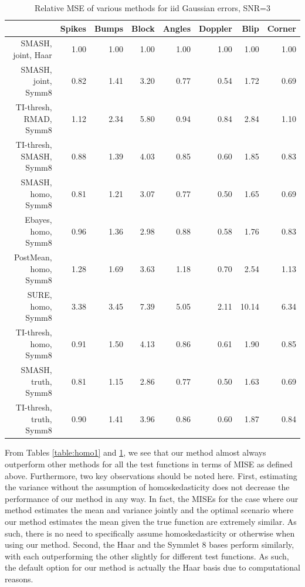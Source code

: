 \documentclass[12pt]{article}
\begin{document}
\begin{table}[ht]
\centering
\begin{tabular}{rrrrrrrr}
  \hline
 & Spikes & Bumps & Block & Angles & Doppler & Blip & Corner \\
  \hline
SMASH, joint, Haar & 1.00 & 1.00 & 1.00 & 1.00 & 1.00 & 1.00 & 1.00 \\
  SMASH, joint, Symm8 & 0.82 & 1.41 & 3.20 & 0.77 & 0.54 & 1.72 & 0.69 \\
  TI-thresh, RMAD, Symm8 & 1.12 & 2.34 & 5.80 & 0.94 & 0.84 & 2.84 & 1.10 \\
  TI-thresh, SMASH, Symm8 & 0.88 & 1.39 & 4.03 & 0.85 & 0.60 & 1.85 & 0.83 \\
  SMASH, homo, Symm8 & 0.81 & 1.21 & 3.07 & 0.77 & 0.50 & 1.65 & 0.69 \\
  Ebayes, homo, Symm8 & 0.96 & 1.36 & 2.98 & 0.88 & 0.58 & 1.76 & 0.83 \\
  PostMean, homo, Symm8 & 1.28 & 1.69 & 3.63 & 1.18 & 0.70 & 2.54 & 1.13 \\
  SURE, homo, Symm8 & 3.38 & 3.45 & 7.39 & 5.05 & 2.11 & 10.14 & 6.34 \\
  TI-thresh, homo, Symm8 & 0.91 & 1.50 & 4.13 & 0.86 & 0.61 & 1.90 & 0.85 \\
  SMASH, truth, Symm8 & 0.81 & 1.15 & 2.86 & 0.77 & 0.50 & 1.63 & 0.69 \\
  TI-thresh, truth, Symm8 & 0.90 & 1.41 & 3.96 & 0.86 & 0.60 & 1.87 & 0.84 \\
   \hline
\end{tabular}
\caption{Relative MSE of various methods for iid Gaussian errors, SNR=3} 
\label{table:homo3}
\end{table}
From Tables \ref{table:homo1} and \ref{table:homo3}, we see that our method almost always outperform other methods for all the test functions in terms of MISE as defined above. Furthermore, two key observations should be noted here. First, estimating the variance without the assumption of homoskedasticity does not decrease the performance of our method in any way. In fact, the MISEs for the case where our method estimates the mean and variance jointly and the optimal scenario where our method estimates the mean given the true function are extremely similar. As such, there is no need to specifically assume homoskedasticity or otherwise when using our method. Second, the Haar and the Symmlet 8 bases perform similarly, with each outperforming the other slightly for different test functions. As such, the default option for our method is actually the Haar basis due to computational reasons. \bigskip\\
\end{document}
